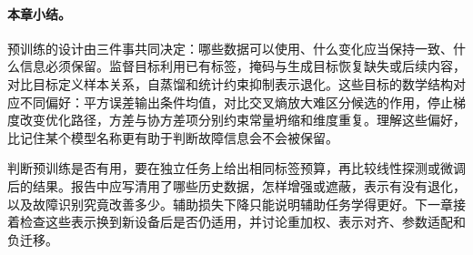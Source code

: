 \paragraph{本章小结。}
预训练的设计由三件事共同决定：哪些数据可以使用、什么变化应当保持一致、什么信息必须保留。监督目标利用已有标签，掩码与生成目标恢复缺失或后续内容，对比目标定义样本关系，自蒸馏和统计约束抑制表示退化。这些目标的数学结构对应不同偏好：平方误差输出条件均值，对比交叉熵放大难区分候选的作用，停止梯度改变优化路径，方差与协方差项分别约束常量坍缩和维度重复。理解这些偏好，比记住某个模型名称更有助于判断故障信息会不会被保留。

判断预训练是否有用，要在独立任务上给出相同标签预算，再比较线性探测或微调后的结果。报告中应写清用了哪些历史数据，怎样增强或遮蔽，表示有没有退化，以及故障识别究竟改善多少。辅助损失下降只能说明辅助任务学得更好。下一章接着检查这些表示换到新设备后是否仍适用，并讨论重加权、表示对齐、参数适配和负迁移。

